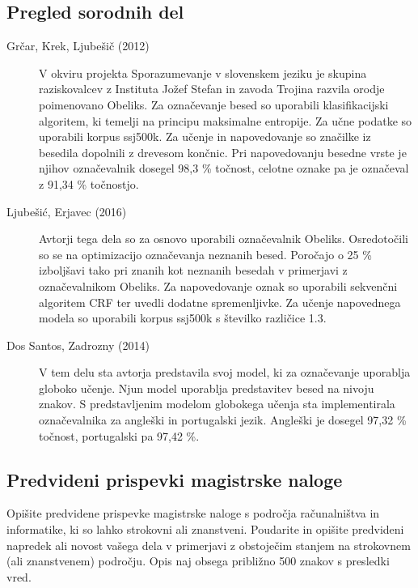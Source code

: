 \documentclass[a4paper, 12pt]{article}
\begin{document}
\subsection{Pregled sorodnih del}

\begin{description}
  \item [Grčar, Krek, Ljubešič (2012) \cite{Grcar2012}] V okviru projekta Sporazumevanje v slovenskem jeziku je skupina raziskovalcev z Instituta Jožef Stefan in zavoda Trojina razvila orodje poimenovano Obeliks. Za označevanje besed so uporabili klasifikacijski algoritem, ki temelji na principu maksimalne entropije. Za učne podatke so uporabili korpus ssj500k. Za učenje in napovedovanje so značilke iz besedila dopolnili z drevesom končnic. Pri napovedovanju besedne vrste je njihov označevalnik dosegel 98,3 \% točnost, celotne oznake pa je označeval z 91,34 \% točnostjo.\\
  \item [Ljubešić, Erjavec (2016) \cite{Ljubesic2016}] Avtorji tega dela so za osnovo uporabili označevalnik Obeliks. Osredotočili so se na optimizacijo označevanja neznanih besed. Poročajo o 25 \% izboljšavi tako pri znanih kot neznanih besedah v primerjavi z označevalnikom Obeliks. Za napovedovanje oznak so uporabili sekvenčni algoritem CRF ter uvedli dodatne spremenljivke. Za učenje napovednega modela so uporabili korpus ssj500k s številko različice 1.3.
  \item [Dos Santos, Zadrozny (2014) \cite{Santos2014}] V tem delu sta avtorja predstavila svoj model, ki za označevanje uporablja globoko učenje. Njun model uporablja predstavitev besed na nivoju znakov. S predstavljenim modelom globokega učenja sta implementirala označevalnika za angleški in portugalski jezik. Angleški je dosegel 97,32 \% točnost, portugalski pa 97,42 \%.

\end{description}

\subsection{Predvideni prispevki magistrske naloge}

Opišite predvidene prispevke magistrske naloge s področja računalništva in informatike, ki so lahko strokovni ali znanstveni. Poudarite in opišite predvideni napredek ali novost vašega dela v primerjavi z obstoječim stanjem na strokovnem (ali znanstvenem) področju. Opis naj obsega približno 500 znakov s presledki vred.
\end{document}
